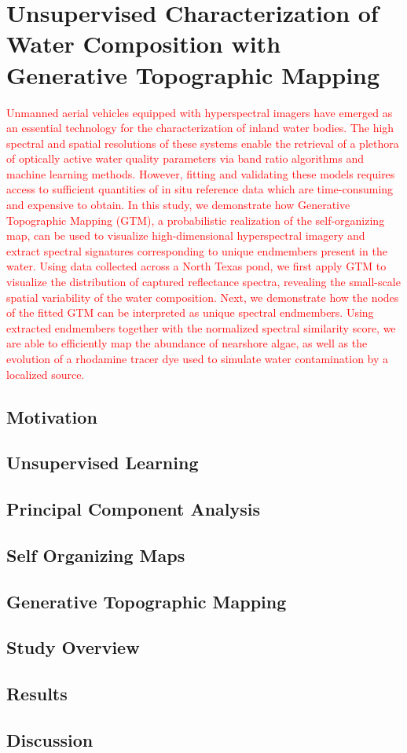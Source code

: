 \chapter{Unsupervised Characterization of Water Composition with Generative Topographic Mapping}\label{ch:robot-team-gtm}

\textcolor{red}{
  Unmanned aerial vehicles equipped with hyperspectral imagers have emerged as
  an essential technology for the characterization of inland water bodies. The
  high spectral and spatial resolutions of these systems enable the retrieval
  of a plethora of optically active water quality parameters via band ratio
  algorithms and machine learning methods. However, fitting and validating
  these models requires access to sufficient quantities of in situ reference
  data which are time-consuming and expensive to obtain. In this study, we
  demonstrate how Generative Topographic Mapping (GTM), a probabilistic
  realization of the self-organizing map, can be used to visualize
  high-dimensional hyperspectral imagery and extract spectral signatures
  corresponding to unique endmembers present in the water.  Using data
  collected across a North Texas pond, we first apply  GTM to visualize the
  distribution of captured reflectance spectra, revealing the small-scale
  spatial variability of the water composition. Next, we demonstrate how the
  nodes of the fitted GTM can be interpreted as unique spectral endmembers.
  Using extracted endmembers together with the normalized spectral similarity
  score, we are able to efficiently map the abundance of nearshore algae, as
  well as the evolution of a rhodamine tracer dye used to simulate water
  contamination by a localized source.
}



\section{Motivation}

\section{Unsupervised Learning}

\section{Principal Component Analysis}

\section{Self Organizing Maps}

\section{Generative Topographic Mapping}

\section{Study Overview}

\section{Results}

\section{Discussion}
